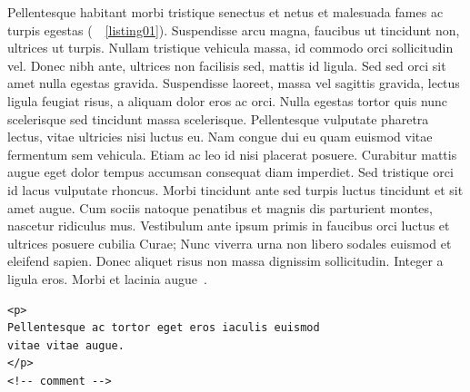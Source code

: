 \documentclass[a4paper, 12pt, twoside, openright]{book}
\begin{document}
Pellentesque habitant morbi tristique senectus et netus et malesuada fames ac turpis egestas (\seename\ \lstlistingname~\ref{listing01}). Suspendisse arcu magna, faucibus ut tincidunt non, ultrices ut turpis. Nullam tristique vehicula massa, id commodo orci sollicitudin vel. Donec nibh ante, ultrices non facilisis sed, mattis id ligula. Sed sed orci sit amet nulla egestas gravida. Suspendisse laoreet, massa vel sagittis gravida, lectus ligula feugiat risus, a aliquam dolor eros ac orci. Nulla egestas tortor quis nunc scelerisque sed tincidunt massa scelerisque. Pellentesque vulputate pharetra lectus, vitae ultricies nisi luctus eu. Nam congue dui eu quam euismod vitae fermentum sem vehicula. Etiam ac leo id nisi placerat posuere. Curabitur mattis augue eget dolor tempus accumsan consequat diam imperdiet. Sed tristique orci id lacus vulputate rhoncus. Morbi tincidunt ante sed turpis luctus tincidunt et sit amet augue. Cum sociis natoque penatibus et magnis dis parturient montes, nascetur ridiculus mus. Vestibulum ante ipsum primis in faucibus orci luctus et ultrices posuere cubilia Curae; Nunc viverra urna non libero sodales euismod et eleifend sapien. Donec aliquet risus non massa dignissim sollicitudin. Integer a ligula eros. Morbi et lacinia augue~\cite{bookname}.

\begin{lstlisting}[caption={caption text},label=listing01]
<p>
Pellentesque ac tortor eget eros iaculis euismod
vitae vitae augue.
</p>
<!-- comment -->
\end{lstlisting}


\backmatter

\begingroup %
  \makeatletter
  \let\ps@plain\ps@empty
  \makeatother
  
\endgroup
\end{document}
